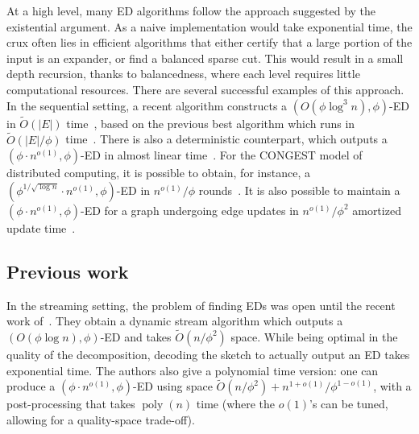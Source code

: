 \documentclass[epsfig,letter,11pt]{article}
\numberwithin{equation}{section}
\newcommand{\otil}{\tilde{O}}
\renewcommand{\tilde}{\widetilde}
\DeclareMathOperator*{\poly}{poly}
\begin{document}
At a high level, many ED algorithms follow the approach suggested by the existential argument. As a naive implementation would take exponential time, the crux often lies in efficient algorithms that either certify that a large portion of the input is an expander, or find a balanced sparse cut. This would result in a small depth recursion, thanks to balancedness, where each level requires little computational resources. There are several successful examples of this approach. In the sequential setting, a recent algorithm constructs a $(O(\phi \log^3 n), \phi)$-ED in $\otil(|E|)$ time~\cite{liexpdec}, based on the previous best algorithm which runs in $\otil(|E|/\phi)$ time~\cite{offlineexpdec}. There is also a deterministic counterpart, which outputs a $(\phi \cdot n^{o(1)}, \phi)$-ED in almost linear time~\cite{determexpdec}. For the CONGEST model of distributed computing, it is possible to obtain, for instance, a $(\phi^{1/\sqrt{\log n}} \cdot n^{o(1)}, \phi)$-ED in $n^{o(1)} / \phi$ rounds~\cite{triang}. It is also possible to maintain a $(\phi \cdot n^{o(1)},\phi)$-ED for a graph undergoing edge updates in $n^{o(1)}/\phi^2$ amortized update time~\cite{boundlink,dynexpdec}.

\subsection{Previous work}
In the streaming setting, the problem of finding EDs was open until the recent work of~\cite{streamexpdec}. They obtain a dynamic stream algorithm which outputs a $(O(\phi \log n),\phi)$-ED and takes $\otil(n/\phi^2)$ space. While being optimal in the quality of the decomposition, decoding the sketch to actually output an ED takes exponential time. The authors also give a polynomial time version: one can produce a $(\phi \cdot n^{o(1)}, \phi)$-ED using space $\otil(n/\phi^2)+n^{1+o(1)}/\phi^{1-o(1)}$, with a post-processing that takes $\poly(n)$ time (where the $o(1)$'s can be tuned, allowing for a quality-space trade-off).
\end{document}
